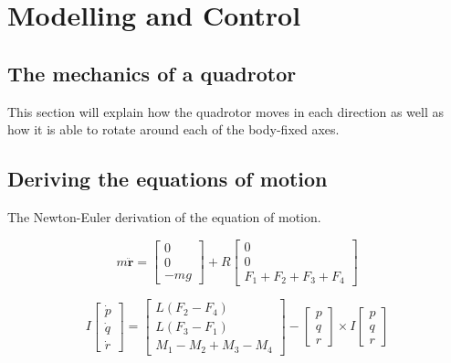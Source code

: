 \chapter{Modelling and Control}

\section{The mechanics of a quadrotor}
This section will explain how the quadrotor moves in each direction as well as how it is able to rotate around each of the body-fixed axes.
\lipsum[1-10]
\section{Deriving the equations of motion}
The Newton-Euler derivation of the equation of motion.

\begin{equation}
    m \ddot{\textbf{r}} = \begin{bmatrix}
        0 \\ 0 \\ -mg
    \end{bmatrix}
    + R \begin{bmatrix}
    0 \\ 0 \\ F_1+F_2+F_3+F_4
    \end{bmatrix}
\end{equation}

\begin{equation}
    I \begin{bmatrix} \dot{p} \\ \dot{q} \\ \dot{r} \end{bmatrix} = \begin{bmatrix} L(F_2-F_4) \\ L(F_3-F_1) \\ M_1-M_2+M_3-M_4 \end{bmatrix} - \begin{bmatrix} p \\ q \\ r \end{bmatrix} \times I \begin{bmatrix} p \\ q \\ r \end{bmatrix}
\end{equation}

